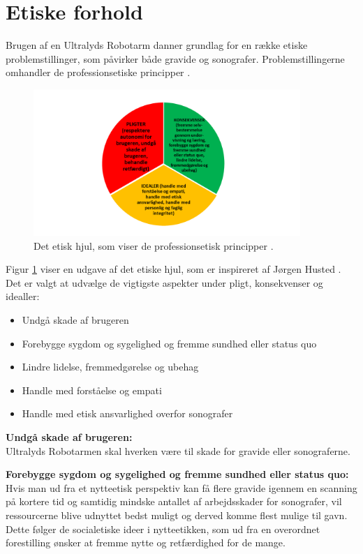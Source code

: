\section{Etiske forhold}
Brugen af en Ultralyds Robotarm danner grundlag for en række etiske problemstillinger, som påvirker både gravide og sonografer. 
Problemstillingerne omhandler de professionsetiske principper \cite{Husted}. 

\begin{figure}[H]\centering
	\includegraphics[width = 0.9\textwidth]{Figurer/Detetiskehjul}
	\caption{Det etisk hjul, som viser de professionsetisk principper \cite{Etiskehjul}.}
	\label{etiskhjul}
\end{figure}

Figur \ref{etiskhjul} viser en udgave af det etiske hjul, som er inspireret af Jørgen Husted \cite{Etiskehjul}. Det er valgt at udvælge de vigtigste aspekter under pligt, konsekvenser og idealler: 
\begin{itemize}
		\item Undgå skade af brugeren
		\item Forebygge sygdom og sygelighed og fremme sundhed eller status quo
		\item Lindre lidelse, fremmedgørelse og ubehag
		\item Handle med forståelse og empati
		\item Handle med etisk ansvarlighed overfor sonografer 
\end{itemize} 

\textbf{Undgå skade af brugeren:} \\
Ultralyds Robotarmen skal hverken være til skade for gravide eller sonograferne.

\textbf{Forebygge sygdom og sygelighed og fremme sundhed eller status quo:} \\
Hvis man ud fra et nytteetisk perspektiv kan få flere gravide igennem en scanning på kortere tid og samtidig mindske antallet af arbejdsskader for sonografer, vil ressourcerne blive udnyttet bedst muligt og derved komme flest mulige til gavn. Dette følger de socialetiske ideer i nytteetikken, som ud fra en overordnet forestilling ønsker at fremme nytte og retfærdighed for de mange.
    
